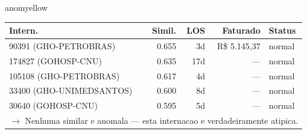 \documentclass[a4paper,10pt]{article}
\begin{document}
\begin{anomalycard}[Internacao 184164 | PASA | MODERADO (z=2.23)]{anomyellow}
\begin{tabular}{l r r r l}\toprule\textbf{Intern.} & \textbf{Simil.} & \textbf{LOS} & \textbf{Faturado} & \textbf{Status} \\\midrule
90391 (GHO-PETROBRAS) & 0.655 & 3d & R\$ 5.145,37 & \textcolor{jcubeblue}{normal} \\
174827 (GOHOSP-CNU) & 0.635 & 17d & --- & \textcolor{jcubeblue}{normal} \\
105108 (GHO-PETROBRAS) & 0.617 & 4d & --- & \textcolor{jcubeblue}{normal} \\
33400 (GHO-UNIMEDSANTOS) & 0.600 & 8d & --- & \textcolor{jcubeblue}{normal} \\
30640 (GOHOSP-CNU) & 0.595 & 5d & --- & \textcolor{jcubeblue}{normal} \\
\multicolumn{5}{l}{\textcolor{jcubeblue}{\small $\rightarrow$ Nenhuma similar e anomala --- esta internacao e verdadeiramente atipica.}} \\
\bottomrule\end{tabular}


\end{anomalycard}

\newpage
\end{document}
